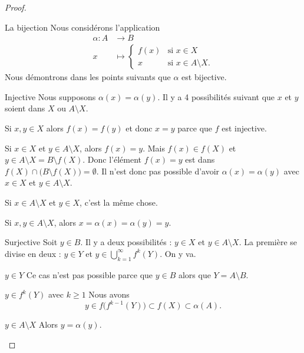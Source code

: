 \begin{proof}
\begin{subproof}
        \item[La bijection]
            Nous considérons l'application
            \begin{equation}
                \begin{aligned}
                    \alpha\colon A&\to B \\
                    x&\mapsto \begin{cases}
                        f(x)    &   \text{si } x\in X\\
                        x    &    \text{si } x\in A\setminus X.
                    \end{cases}
                \end{aligned}
            \end{equation}
            Nous démontrons dans les points suivants que \( \alpha\) est bijective.
        \item[Injective]
            Nous supposons \( \alpha(x)=\alpha(y)\). Il y a 4 possibilités suivant que \( x\) et \( y\) soient dans \( X\) ou \( A\setminus X\).

            Si \( x,y\in X\) alors \( f(x)=f(y)\) et donc \( x=y\) parce que \( f\) est injective.

            Si \( x\in X\) et \( y\in A\setminus X\), alors \( f(x)=y\). Mais \( f(x)\in f(X)\) et \( y\in A\setminus X=B\setminus f(X)\). Donc l'élément \( f(x)=y\) est dans \( f(X)\cap \big( B\setminus f(X) \big)=\emptyset\). Il n'est donc pas possible d'avoir \( \alpha(x)=\alpha(y)\) avec \( x\in X\) et \( y\in A\setminus X\).

            Si \( x\in A\setminus X\) et \( y\in X\), c'est la même chose.

            Si \( x,y\in A\setminus X\), alors \( x=\alpha(x)=\alpha(y)=y\).

        \item[Surjective]
            Soit \( y\in B\). Il y a deux possibilités : \( y\in X\) et \( y\in A\setminus X\). La première se divise en deux : \( y\in Y\) et \( y\in \bigcup_{k=1}^{\infty}f^k(Y)\). On y va.

            \begin{subproof}
                \item[\( y\in Y\)]
                    Ce cas n'est pas possible parce que \( y\in B\) alors que \( Y=A\setminus B\).
                \item[\( y\in f^k(Y)\) avec \( k\geq 1\)]
                    Nous avons
                    \begin{equation}
                         y\in f\big( f^{k-1}(Y) \big)\subset f(X)\subset \alpha(A).
                    \end{equation}
                \item[\( y\in A\setminus X\)]
                    Alors \( y=\alpha(y)\).
            \end{subproof}
    \end{subproof}
\end{proof}

